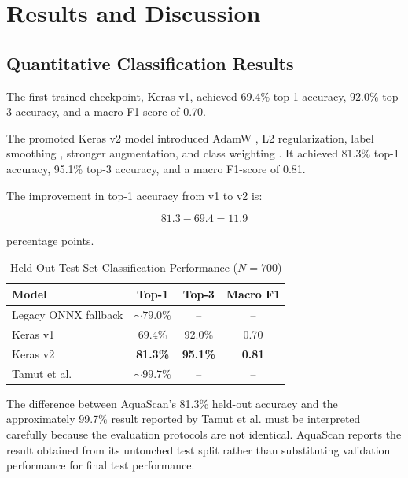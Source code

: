 \documentclass[conference]{IEEEtran}
\begin{document}

\section{Results and Discussion}

\subsection{Quantitative Classification Results}

The first trained checkpoint, Keras v1, achieved 69.4\% top-1 accuracy, 92.0\% top-3 accuracy, and a macro F1-score of 0.70.

The promoted Keras v2 model introduced AdamW \cite{b11}, L2 regularization, label smoothing \cite{b29}, stronger augmentation, and class weighting \cite{b3}. It achieved 81.3\% top-1 accuracy, 95.1\% top-3 accuracy, and a macro F1-score of 0.81.

The improvement in top-1 accuracy from v1 to v2 is:

\begin{equation}
81.3-69.4=11.9
\end{equation}

percentage points.

\begin{table}[!t]
\caption{Held-Out Test Set Classification Performance ($N=700$)}
\centering
\scriptsize
\begin{tabular}{l c c c}
\toprule
\textbf{Model} & \textbf{Top-1} & \textbf{Top-3} & \textbf{Macro F1}\\
\midrule
Legacy ONNX fallback & $\sim79.0\%$ & -- & --\\
Keras v1 & 69.4\% & 92.0\% & 0.70\\
Keras v2 & \textbf{81.3\%} & \textbf{95.1\%} & \textbf{0.81}\\
Tamut et al. \cite{b1} & $\sim99.7\%$ & -- & --\\
\bottomrule
\end{tabular}
\label{tab:performance}
\end{table}

The difference between AquaScan's 81.3\% held-out accuracy and the approximately 99.7\% result reported by Tamut et al. \cite{b1} must be interpreted carefully because the evaluation protocols are not identical. AquaScan reports the result obtained from its untouched test split rather than substituting validation performance for final test performance.
\end{document}
